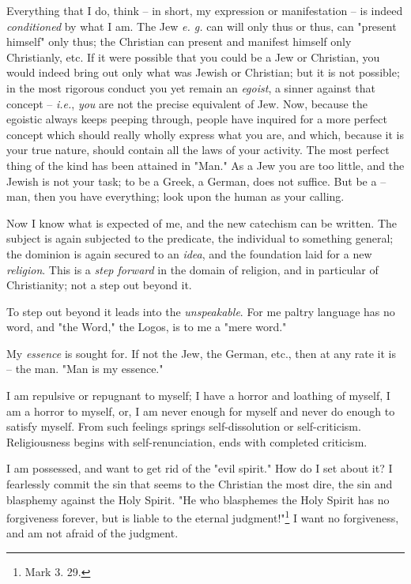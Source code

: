 \documentclass[a4paper]{book}
\begin{document}
Everything that I do, think -- in short, my expression or manifestation -- is 
indeed \textit{conditioned} by what I am. The Jew \textit{e. g.} can will only 
thus or thus, can "{}present himself"{} only thus; the Christian can present 
and manifest himself only Christianly, etc. If it were possible that you could 
be a Jew or Christian, you would indeed bring out only what was Jewish or 
Christian; but it is not possible; in the most rigorous conduct you yet remain 
an \textit{egoist}, a sinner against that concept -- \textit{i.e.}, 
\textit{you} are not the precise equivalent of Jew. Now, because the egoistic 
always keeps peeping through, people have inquired for a more perfect concept 
which should really wholly express what you are, and which, because it is your 
true nature, should contain all the laws of your activity. The most perfect 
thing of the kind has been attained in "{}Man."{} As a Jew you are too little, 
and the Jewish is not your task; to be a Greek, a German, does not suffice. 
But be a -- man, then you have everything; look upon the human as your 
calling.

Now I know what is expected of me, and the new catechism can be written. The 
subject is again subjected to the predicate, the individual to something 
general; the dominion is again secured to an \textit{idea}, and the foundation 
laid for a new \textit{religion}. This is a \textit{step forward} in the 
domain of religion, and in particular of Christianity; not a step out beyond 
it.

To step out beyond it leads into the \textit{unspeakable}. For me paltry 
language has no word, and "{}the Word,"{} the Logos, is to me a "{}mere 
word."{}

My \textit{essence} is sought for. If not the Jew, the German, etc., then at 
any rate it is -- the man. "{}Man is my essence."{}

I am repulsive or repugnant to myself; I have a horror and loathing of myself, 
I am a horror to myself, or, I am never enough for myself and never do enough 
to satisfy myself. From such feelings springs self-dissolution or 
self-criticism. Religiousness begins with self-renunciation, ends with 
completed criticism.

I am possessed, and want to get rid of the "{}evil spirit."{} How do I set 
about it? I fearlessly commit the sin that seems to the Christian the most 
dire, the sin and blasphemy against the Holy Spirit. "{}He who blasphemes the 
Holy Spirit has no forgiveness forever, but is liable to the eternal 
judgment!"{}\footnote{Mark 3. 29.} I want no forgiveness, and am not afraid of 
the judgment.
\end{document}

